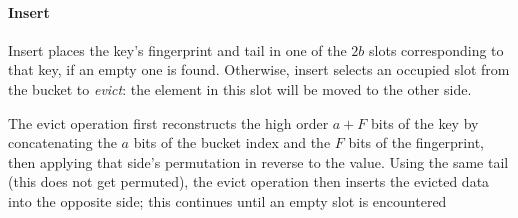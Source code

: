 \documentclass[letterpaper,twocolumn,10pt]{article}
\newcommand{\ints}{\mathbb{Z}}
\newcommand{\dotcup}{\ensuremath{\mathaccent\cdot\cup}}
\newcommand{\TCF}{SCF}
\newcommand{\TCF}{TCF}
\begin{document}

\paragraph{Insert}
Insert places the key's fingerprint and tail in one of the $2b$ slots corresponding to that key, if an empty one is found.
Otherwise, insert selects an occupied slot from the bucket to {\em evict}: the element in this slot will be moved to the other side. %

The evict operation first reconstructs the high order $a + F$ bits of the key by concatenating the $a$ bits of the bucket index and the $F$ bits of the fingerprint, then applying that side's permutation in reverse to the value. %
Using the same tail (this does not get permuted), the evict operation then inserts the evicted data into the opposite side;
this continues until an empty slot is encountered %



\end{document}
